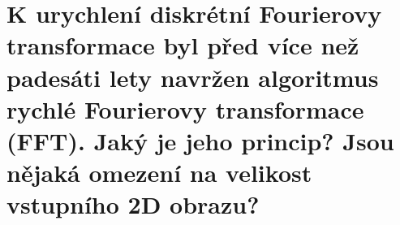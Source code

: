 \section{K urychlení diskrétní Fourierovy transformace byl před více než padesáti lety navržen algoritmus rychlé 
Fourierovy transformace (FFT). Jaký je jeho princip? Jsou nějaká omezení na velikost vstupního 2D obrazu?}